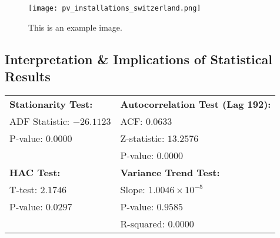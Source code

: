\documentclass[12pt]{article}
\begin{document}
\begin{figure}[h!]
    \centering
    \texttt{[image: pv\_installations\_switzerland.png]}
    \caption{This is an example image.}
    \label{fig:1}
\end{figure}

\subsection{Interpretation \& Implications of Statistical Results }

\begin{center}
\begin{tabular}{|p{}|p{}|}
    \hline
    \textbf{Stationarity Test:} & \textbf{Autocorrelation Test (Lag 192):} \\
    ADF Statistic: $-26.1123$ & ACF: $0.0633$ \\
    P-value: $0.0000$ & Z-statistic: $13.2576$ \\
     & P-value: $0.0000$ \\ \hline
    \textbf{HAC Test:} & \textbf{Variance Trend Test:} \\
    T-test: $2.1746$ & Slope: $1.0046 \times 10^{-5}$ \\
    P-value: $0.0297$ & P-value: $0.9585$ \\
     & R-squared: $0.0000$ \\
    \hline
\end{tabular}
\end{center}
\end{document}
